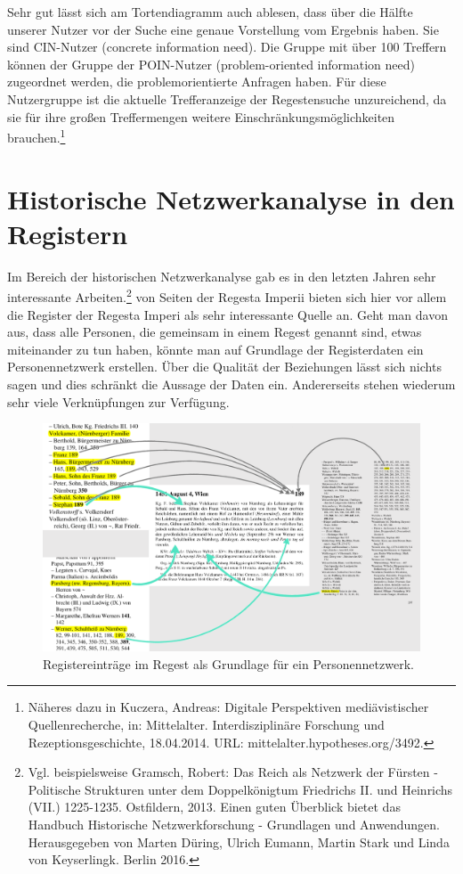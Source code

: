 \documentclass[ngerman,]{scrreprt}
\begin{document}
Sehr gut lässt sich am Tortendiagramm auch ablesen, dass über die Hälfte unserer Nutzer vor der Suche eine genaue Vorstellung vom Ergebnis haben. Sie sind CIN-Nutzer (concrete information need). Die Gruppe mit über 100 Treffern können der Gruppe der POIN-Nutzer (problem-oriented information need) zugeordnet werden, die problemorientierte Anfragen haben. Für diese Nutzergruppe ist die aktuelle Trefferanzeige der Regestensuche unzureichend, da sie für ihre großen Treffermengen weitere Einschränkungsmöglichkeiten brauchen.\footnote{Näheres dazu in Kuczera, Andreas: Digitale Perspektiven mediävistischer Quellenrecherche, in: Mittelalter. Interdisziplinäre Forschung und Rezeptionsgeschichte, 18.04.2014. URL: mittelalter.hypotheses.org/3492.}

\section{Historische Netzwerkanalyse in den Registern}\label{historische-netzwerkanalyse-in-den-registern}

Im Bereich der historischen Netzwerkanalyse gab es in den letzten Jahren sehr interessante Arbeiten.\footnote{Vgl. beispielsweise Gramsch, Robert: Das Reich als Netzwerk der Fürsten - Politische Strukturen unter dem Doppelkönigtum Friedrichs II. und Heinrichs (VII.) 1225-1235. Ostfildern, 2013. Einen guten Überblick bietet das Handbuch Historische Netzwerkforschung - Grundlagen und Anwendungen. Herausgegeben von Marten Düring, Ulrich Eumann, Martin Stark und Linda von Keyserlingk. Berlin 2016.} von Seiten der Regesta Imperii bieten sich hier vor allem die Register der Regesta Imperi als sehr interessante Quelle an. Geht man davon aus, dass alle Personen, die gemeinsam in einem Regest genannt sind, etwas miteinander zu tun haben, könnte man auf Grundlage der Registerdaten ein Personennetzwerk erstellen. Über die Qualität der Beziehungen lässt sich nichts sagen und dies schränkt die Aussage der Daten ein. Andererseits stehen wiederum sehr viele Verknüpfungen zur Verfügung.

\begin{figure}
\centering
\includegraphics{Bilder/Register-und-Regest-19-189.png}
\caption{Registereinträge im Regest als Grundlage für ein Personennetzwerk.}
\end{figure}
\end{document}
